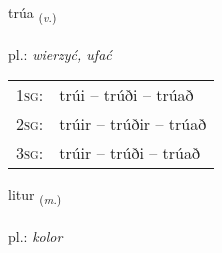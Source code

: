 \documentclass[frontgrid, backgrid]{flacards}\usepackage[]{graphicx}\usepackage[]{xcolor}
\begin{document}
\renewcommand{\flhead}{\vskip5pt \fboxsep=0pt {\small\bfseries\footnotesize Sagnorð | czasownik}}
\renewcommand{\fcfoot}{\vskip5pt \fboxsep=0pt \hspace{2pt}{\small\bfseries\footnotesize 1K}}

\renewcommand{\blhead}{\vskip5pt {\small\bfseries\footnotesize Sagnorð | czasownik }}
\renewcommand{\bcfoot}{\vskip5pt \hspace{2pt}{\small\bfseries\footnotesize 1K}}


{trúa \small{\textsubscript{(\textit{v.})}} \\[1ex] %
\textphonetic{[tʰruːa]} \\
pl.: \emph{wierzyć, ufać} \\  [2ex]
\renewcommand*{\arraystretch}{0.8}
\begin{tabular}{p{1cm}l}
\textsc{1sg}: & trúi -- trúði -- trúað \\ 
\textsc{2sg}: & trúir -- trúðir -- trúað \\ 
\textsc{3sg}: & trúir -- trúði -- trúað \\ 
\end{tabular}
}

\renewcommand{\flhead}{\vskip5pt \fboxsep=0pt {\small\bfseries\footnotesize Nafnorð | rzeczownik}}
\renewcommand{\fcfoot}{\vskip5pt \fboxsep=0pt \hspace{2pt}{\small\bfseries\footnotesize 1K}}

\renewcommand{\blhead}{\vskip5pt {\small\bfseries\footnotesize Nafnorð | rzeczownik }}
\renewcommand{\bcfoot}{\vskip5pt \hspace{2pt}{\small\bfseries\footnotesize 1K}}


{litur \small{\textsubscript{(\textit{m.})}} \\[1ex] %
\textphonetic{[lɪːtʏr]} \\
pl.: \emph{kolor} \\  [2ex]
\renewcommand*{\arraystretch}{0.8}
}
\end{document}
